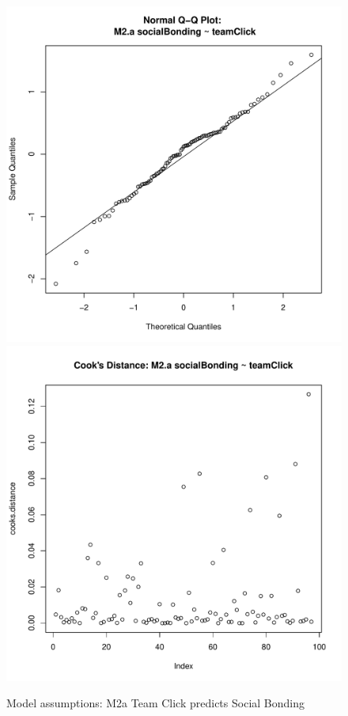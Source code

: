 {\begin{figure}[htbp]
                \includegraphics[scale =.4]{images/MLM2aQQNorm.pdf}
                \includegraphics[scale =.4]{images/MLM2aCooksD.pdf}
                \caption{Model assumptions: M2a Team Click predicts Social Bonding}
                \label{fig:MLM2aAssumptions}
              \end{figure}




}
